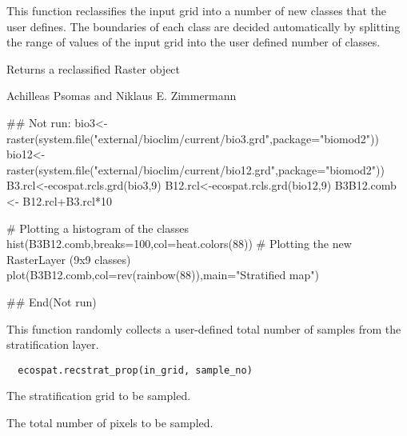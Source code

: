 \documentclass[a4paper]{book}
\begin{document}
%
\begin{Details}\relax
This function reclassifies the input grid into a number of new classes that the user defines. The boundaries of each class are decided automatically by splitting the range of values of the input grid into the user defined number of classes.
\end{Details}
%
\begin{Value}
Returns a reclassified Raster object
\end{Value}
%
\begin{Author}\relax
Achilleas Psomas  and Niklaus E. Zimmermann 
\end{Author}
%
\begin{Examples}
\begin{ExampleCode}

   ## Not run: 
bio3<- raster(system.file("external/bioclim/current/bio3.grd",package="biomod2"))
bio12<- raster(system.file("external/bioclim/current/bio12.grd",package="biomod2"))
B3.rcl<-ecospat.rcls.grd(bio3,9) 
B12.rcl<-ecospat.rcls.grd(bio12,9)
B3B12.comb <- B12.rcl+B3.rcl*10

# Plotting a histogram of the classes
hist(B3B12.comb,breaks=100,col=heat.colors(88)) 
# Plotting the new RasterLayer (9x9 classes)
plot(B3B12.comb,col=rev(rainbow(88)),main="Stratified map") 


## End(Not run)
\end{ExampleCode}
\end{Examples}
%
\begin{Description}\relax
This function randomly collects a user-defined total number of samples from the stratification layer. 
\end{Description}
%
\begin{Usage}
\begin{verbatim}
  ecospat.recstrat_prop(in_grid, sample_no)
\end{verbatim}
\end{Usage}
%
\begin{Arguments}
\begin{ldescription}
\item[\code{in\_grid}] 
The stratification grid to be sampled.

\item[\code{sample\_no}] 
The total number of pixels to be sampled.

\end{ldescription}
\end{Arguments}
\end{document}
